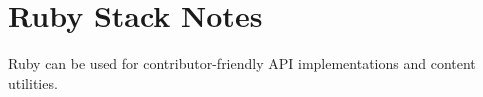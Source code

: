 \section{Ruby Stack Notes}

Ruby can be used for contributor-friendly API implementations and content utilities.
